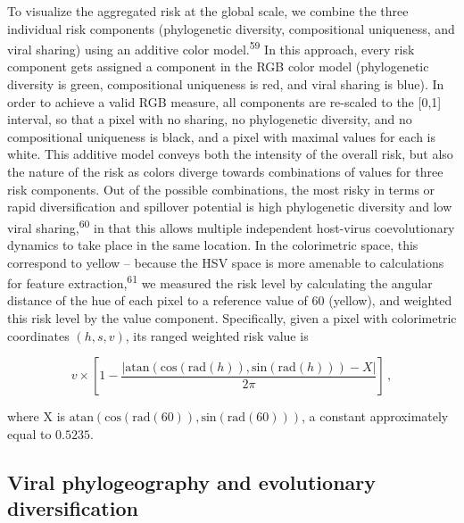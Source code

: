 \documentclass[11pt]{article}
\begin{document}
To visualize the aggregated risk at the global scale, we combine the
three individual risk components (phylogenetic diversity, compositional
uniqueness, and viral sharing) using an additive color
model.\textsuperscript{59} In this approach, every risk component gets
assigned a component in the RGB color model (phylogenetic diversity is
green, compositional uniqueness is red, and viral sharing is blue). In
order to achieve a valid RGB measure, all components are re-scaled to
the {[}0,1{]} interval, so that a pixel with no sharing, no phylogenetic
diversity, and no compositional uniqueness is black, and a pixel with
maximal values for each is white. This additive model conveys both the
intensity of the overall risk, but also the nature of the risk as colors
diverge towards combinations of values for three risk components. Out of
the possible combinations, the most risky in terms or rapid
diversification and spillover potential is high phylogenetic diversity
and low viral sharing,\textsuperscript{60} in that this allows multiple
independent host-virus coevolutionary dynamics to take place in the same
location. In the colorimetric space, this correspond to yellow --
because the HSV space is more amenable to calculations for feature
extraction,\textsuperscript{61} we measured the risk level by
calculating the angular distance of the hue of each pixel to a reference
value of 60 (yellow), and weighted this risk level by the value
component. Specifically, given a pixel with colorimetric coordinates
\((h,s,v)\), its ranged weighted risk value is

\[
v\times\left[1-\frac{\left|\text{atan}\left(\text{cos}(\text{rad}(h)), \text{sin}(\text{rad}(h))\right) - X\right|}{2\pi}\right]\,,
\]

where X is
\(\text{atan}\left(\text{cos}(\text{rad}(60)), \text{sin}(\text{rad}(60))\right)\),
a constant approximately equal to \(0.5235\).

\hypertarget{viral-phylogeography-and-evolutionary-diversification}{%
\subsection{Viral phylogeography and evolutionary
diversification}\label{viral-phylogeography-and-evolutionary-diversification}}
\end{document}
